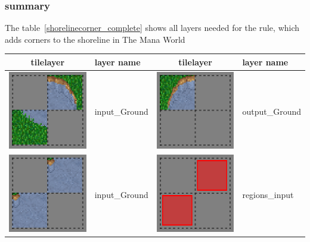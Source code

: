 \subsubsection{summary}
The table~\ref{shorelinecorner_complete} shows all layers needed for the rule, which adds corners to the shoreline in The Mana World
\begin{table}
		\begin{tabular}{|c|l|c|l|}
		\hline
		tilelayer & layer name & tilelayer & layer name\\
		\hline
		\hline
		\includegraphics[scale=1]{Example/TheManaWorld/shorelinecorners/input_Ground2.eps} & input\_Ground & \includegraphics[scale=1]{Example/TheManaWorld/shorelinecorners/output_Ground.eps} & output\_Ground \\
		\hline
		\includegraphics[scale=1]{Example/TheManaWorld/shorelinecorners/input_Ground1.eps} & input\_Ground & \includegraphics[scale=1]{Example/TheManaWorld/shorelinecorners/regions_input.eps} & regions\_input \\

\end{tabular}
\end{table}
